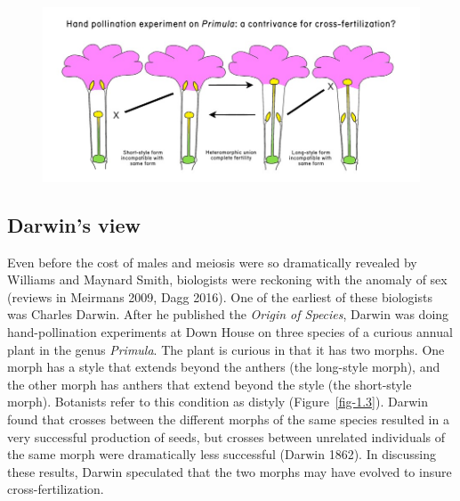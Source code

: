 \documentclass[
  letterpaper,
]{book}
\begin{document}
\begin{figure}


{\centering \includegraphics{images/fig1-3.jpg}

}

\end{figure}

\hypertarget{darwins-view}{%
\subsection{Darwin's view}\label{darwins-view}}

Even before the cost of males and meiosis were so dramatically revealed
by Williams and Maynard Smith, biologists were reckoning with the
anomaly of sex (reviews in Meirmans 2009, Dagg 2016). One of the
earliest of these biologists was Charles Darwin. After he published the
\emph{Origin of Species}, Darwin was doing hand-pollination experiments
at Down House on three species of a curious annual plant in the genus
\emph{Primula}. The plant is curious in that it has two morphs. One
morph has a style that extends beyond the anthers (the long-style
morph), and the other morph has anthers that extend beyond the style
(the short-style morph). Botanists refer to this condition as distyly
(Figure~\ref{fig-1.3}). Darwin found that crosses between the different
morphs of the same species resulted in a very successful production of
seeds, but crosses between unrelated individuals of the same morph were
dramatically less successful (Darwin 1862). In discussing these results,
Darwin speculated that the two morphs may have evolved to insure
cross-fertilization.
\end{document}
